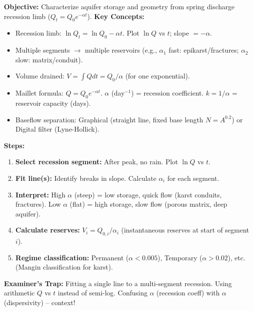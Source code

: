 \documentclass[11pt]{article}
\begin{document}
\begin{methode}
\textbf{Objective:} Characterize aquifer storage and geometry from spring discharge recession limb ($Q_t = Q_0 e^{-\alpha t}$).
\textbf{Key Concepts:}
\begin{itemize}
    \item Recession limb: $\ln Q_t = \ln Q_0 - \alpha t$. Plot $\ln Q$ vs $t$; slope $= -\alpha$.
    \item Multiple segments $\to$ multiple reservoirs (e.g., $\alpha_1$ fast: epikarst/fractures; $\alpha_2$ slow: matrix/conduit).
    \item Volume drained: $V = \int Q dt = Q_0 / \alpha$ (for one exponential).
    \item Maillet formula: $Q = Q_0 e^{-\alpha t}$. $\alpha$ (day$^{-1}$) = recession coefficient. $k = 1/\alpha$ = reservoir capacity (days).
    \item Baseflow separation: Graphical (straight line, fixed base length $N = A^{0.2}$) or Digital filter (Lyne-Hollick).
\end{itemize}
\textbf{Steps:}
\begin{enumerate}
    \item \textbf{Select recession segment:} After peak, no rain. Plot $\ln Q$ vs $t$.
    \item \textbf{Fit line(s):} Identify breaks in slope. Calculate $\alpha_i$ for each segment.
    \item \textbf{Interpret:} High $\alpha$ (steep) = low storage, quick flow (karst conduits, fractures). Low $\alpha$ (flat) = high storage, slow flow (porous matrix, deep aquifer).
    \item \textbf{Calculate reserves:} $V_i = Q_{0,i} / \alpha_i$ (instantaneous reserves at start of segment $i$).
    \item \textbf{Regime classification:} Permanent ($\alpha < 0.005$), Temporary ($\alpha > 0.02$), etc. (Mangin classification for karst).
\end{enumerate}
\textbf{Examiner's Trap:} Fitting a single line to a multi-segment recession. Using arithmetic $Q$ vs $t$ instead of semi-log. Confusing $\alpha$ (recession coeff) with $\alpha$ (dispersivity) -- context!
\end{methode}
\end{document}
